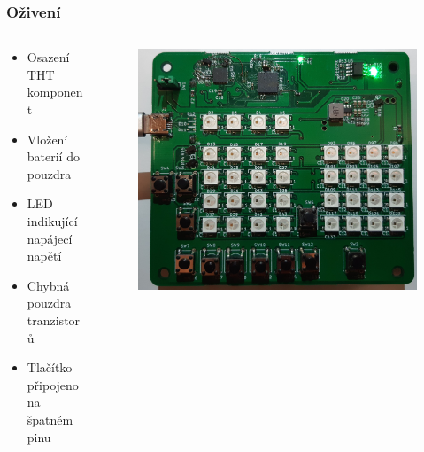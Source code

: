 \documentclass[%
  12pt,       				%
	t,                  %
	aspectratio=1610,   %
	unicode,						%
]{beamer}				    	%
\begin{document}

\begin{frame} 
	\frametitle{Oživení}
	\begin{columns}[T] 	
		\begin{column}{0.4\textwidth}		%
			\vspace{0.5cm}
			\begin{itemize}
				\item Osazení THT komponent
				\item Vložení baterií do pouzdra
				\item LED indikující napájecí napětí
				\item Chybná pouzdra tranzistorů
				\item Tlačítko připojeno na špatném pinu
			\end{itemize}
		\end{column}
		\begin{column}{0.6\textwidth}		%
			\begin{figure}%
				\centering
				\vspace{0.3cm}	              %
				\includegraphics[width=0.8\columnwidth]{obrazky/Verze0_zapnuto_nabito.jpg}
			\end{figure}%
		\end{column}
	\end{columns}
	
\end{frame}
\end{document}
